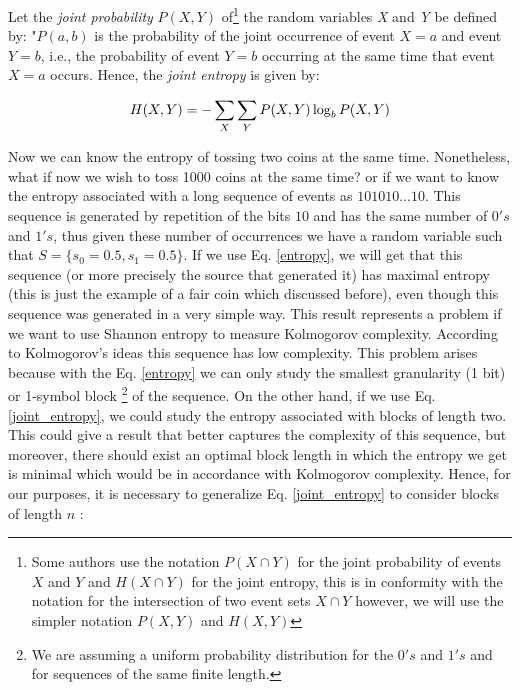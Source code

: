 \begin{defn}
Let the \textit{joint probability} $P(X,Y)$ of\footnote{Some authors use the notation $P(X \cap Y)$ for the joint probability of events $X$ and $Y$ and $H(X \cap Y)$ for the joint entropy, this is in conformity with the notation for the intersection of two event sets $X \cap Y$ however, we will use the simpler notation $P(X,Y)$ and $H(X,Y)$} the random variables \textit{X} and \textit{Y} be defined by: "$P(a,b)$ is the probability of the joint occurrence of event $X=a$ and event $Y=b$, i.e., the probability of event $Y=b$ occurring at the same time that event $X=a$ occurs. Hence, the \textit{joint entropy} is given by:

\begin{equation}
\label{joint_entropy}
  H(X,Y)=-\sum_{X} \sum_{Y} P(X,Y) \log_{b} P(X,Y)\\
\end{equation}

\end{defn}

Now we can know the entropy of tossing two coins at the same time. Nonetheless, what if now we wish to toss 1000 coins at the same time? or if we want to know the entropy associated with a long sequence of events as $101010...10$. This sequence is generated by repetition of the bits $10$ and has the same number of $0's$ and $1's$, thus given these number of occurrences we have a random variable such that $S=\{s_{0}=0.5,s_{1}=0.5 \}$. If we use Eq. \ref{entropy}, we will get that this sequence (or more precisely the source that generated it) has maximal entropy (this is just the example of a fair coin which discussed before), even though this sequence was generated in a very simple way. This result represents a problem if we want to use Shannon entropy to measure Kolmogorov complexity. According to Kolmogorov's ideas this sequence has low complexity. This problem arises because with the Eq. \ref{entropy} we can only study the smallest granularity (1 bit) or 1-symbol block \footnote{We are assuming a uniform probability distribution for the $0's$ and $1's$ and for sequences of the same finite length.} of the sequence. On the other hand, if we use Eq. \ref{joint_entropy}, we could study the entropy associated with blocks of length two. This could give a result that better captures the complexity of this sequence, but moreover, there should exist an optimal block length in which the entropy we get is minimal which would be in accordance with Kolmogorov complexity. Hence, for our purposes, it is necessary to generalize Eq. \ref{joint_entropy} to consider blocks of length $n$ \cite{entropy_wolfram}:

